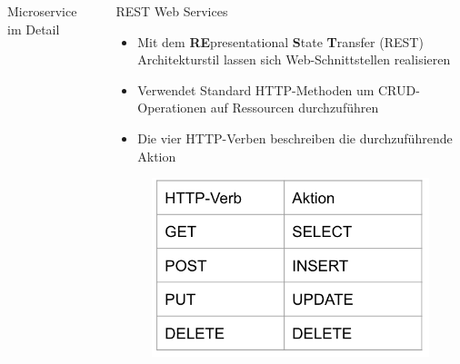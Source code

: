 \documentclass[final]{beamer}
\newlength{\sepwid}
\newlength{\onecolwid}
\newlength{\twocolwid}
\begin{document}
\begin{frame}
\begin{columns}[t]
\begin{column}{\twocolwid}
\begin{columns}[t,totalwidth=\twocolwid]
\begin{column}{\onecolwid}
\begin{block}{Microservice im Detail}
\end{block}

\end{column} %
\begin{column}{\sepwid}\end{column} %

\begin{column}{\onecolwid}\vspace{-.74in} %

\begin{block}{REST Web Services}

\begin{itemize}
\item Mit  dem \textbf{RE}presentational \textbf{S}tate \textbf{T}ransfer (REST) Architekturstil lassen sich Web-Schnittstellen realisieren
\item Verwendet Standard HTTP-Methoden um CRUD-Operationen auf Ressourcen durchzuführen
\item Die vier HTTP-Verben beschreiben die durchzuführende Aktion
	\end{itemize}
	
	\begin{figure}
\includegraphics{http-verben}	
\end{figure}

\end{block}


\end{column}
\end{columns}
\end{column}
\end{columns}
\end{frame}
\end{document}
